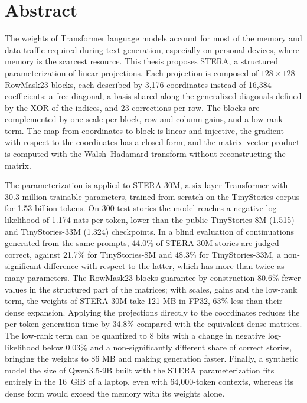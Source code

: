 \vspace{1.5em}
\section*{Abstract}

The weights of Transformer language models account for most of the memory and data traffic required during text generation, especially on personal devices, where memory is the scarcest resource. This thesis proposes STERA, a structured parameterization of linear projections. Each projection is composed of $128\times128$ RowMask23 blocks, each described by 3,176 coordinates instead of 16,384 coefficients: a free diagonal, a basis shared along the generalized diagonals defined by the XOR of the indices, and 23 corrections per row. The blocks are complemented by one scale per block, row and column gains, and a low-rank term. The map from coordinates to block is linear and injective, the gradient with respect to the coordinates has a closed form, and the matrix--vector product is computed with the Walsh--Hadamard transform without reconstructing the matrix.

The parameterization is applied to STERA 30M, a six-layer Transformer with 30.3 million trainable parameters, trained from scratch on the TinyStories corpus for 1.53 billion tokens. On 300 test stories the model reaches a negative log-likelihood of 1.174 nats per token, lower than the public TinyStories-8M (1.515) and TinyStories-33M (1.324) checkpoints. In a blind evaluation of continuations generated from the same prompts, 44.0\% of STERA 30M stories are judged correct, against 21.7\% for TinyStories-8M and 48.3\% for TinyStories-33M, a non-significant difference with respect to the latter, which has more than twice as many parameters. The RowMask23 blocks guarantee by construction 80.6\% fewer values in the structured part of the matrices; with scales, gains and the low-rank term, the weights of STERA 30M take 121 MB in FP32, 63\% less than their dense expansion. Applying the projections directly to the coordinates reduces the per-token generation time by 34.8\% compared with the equivalent dense matrices. The low-rank term can be quantized to 8 bits with a change in negative log-likelihood below 0.03\% and a non-significantly different share of correct stories, bringing the weights to 86 MB and making generation faster. Finally, a synthetic model the size of Qwen3.5-9B built with the STERA parameterization fits entirely in the 16~GiB of a laptop, even with 64,000-token contexts, whereas its dense form would exceed the memory with its weights alone.
